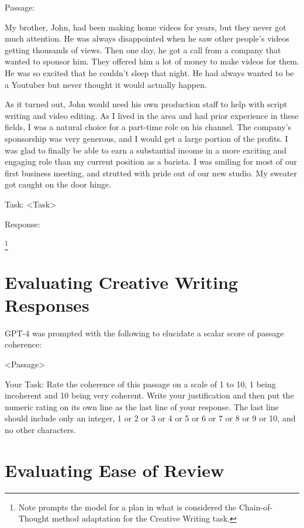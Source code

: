 \documentclass[11pt]{article}
\begin{document}
Passage:

My brother, John, had been making home videos for years, but they never got much attention. He was always disappointed when he saw other people's videos getting thousands of views. Then one day, he got a call from a company that wanted to sponsor him. They offered him a lot of money to make videos for them. He was so excited that he couldn't sleep that night. He had always wanted to be a Youtuber but never thought it would actually happen.

As it turned out, John would need his own production staff to help with script writing and video editing. As I lived in the area and had prior experience in these fields, I was a natural choice for a part-time role on his channel. The company's sponsorship was very generous, and I would get a large portion of the profits. I was glad to finally be able to earn a substantial income in a more exciting and engaging role than my current position as a barista. I was smiling for most of our first business meeting, and strutted with pride out of our new studio. My sweater got caught on the door hinge.

Task: <Task>

Response:

\footnote{Note \citealp{yao_tree_2023} prompts the model for a plan in what is considered the Chain-of-Thought method adaptation for the Creative Writing task.}

\section{Evaluating Creative Writing Responses}
\label{sec:evaluating_creative_writing}

GPT-4 was prompted with the following to elucidate a scalar score of passage coherence:

<Passage>

Your Task: Rate the coherence of this passage on a scale of 1 to 10, 1 being incoherent and 10 being very coherent. Write your justification and then put the numeric rating on its own line as the last line of your response. The last line should include only an integer, 1 or 2 or 3 or 4 or 5 or 6 or 7 or 8 or 9 or 10, and no other characters.

\section{Evaluating Ease of Review}
\label{sec:evaluating_ease_of_review}
\end{document}
